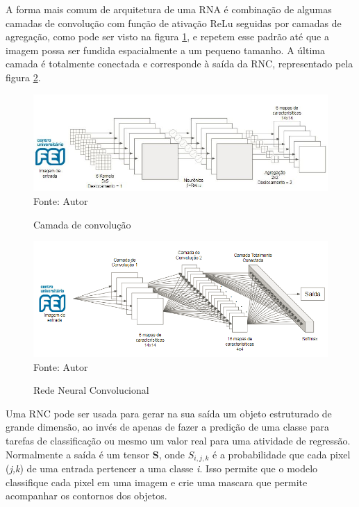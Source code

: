 \documentclass[
	12pt,				%
    oneside,			%
	a4paper,			%
	english,			%
	french,				%
	spanish,			%
	brazil,				%
	]{abntex2}
\begin{document}
A forma mais comum de arquitetura de uma RNA é combinação de algumas camadas de convolução com função de ativação ReLu seguidas por camadas de agregação, como pode ser visto na figura \ref{fig:camada_convolucao}, e repetem esse padrão até que a imagem possa ser fundida espacialmente a um pequeno tamanho. A última camada é totalmente conectada e corresponde à saída da RNC, representado pela figura \ref{fig:RNC}.

\begin{figure}[H]
    \centering
    \caption{Camada de convolução}
    \includegraphics[width=\textwidth]{camada_convolucao1}\\
    Fonte: Autor\hfill
    \label{fig:camada_convolucao}
\end{figure} 

\begin{figure}[H]
    \centering
    \caption{Rede Neural Convolucional}
    \includegraphics[width=\textwidth]{RNC1}\\
    Fonte: Autor\hfill
    \label{fig:RNC}
\end{figure} 




Uma RNC pode ser usada para gerar na sua saída um objeto estruturado de grande dimensão, ao invés de apenas de fazer a predição de uma classe para tarefas de classificação ou mesmo um valor real para uma atividade de regressão. Normalmente a saída é um tensor \textbf{S}, onde \textbf{$S_{i,j,k}$} é a probabilidade que cada pixel (\textit{j,k}) de uma entrada pertencer a uma classe \textit{i}. Isso permite que o modelo classifique cada pixel em uma imagem e crie uma mascara que permite acompanhar os contornos dos objetos.
\end{document}
